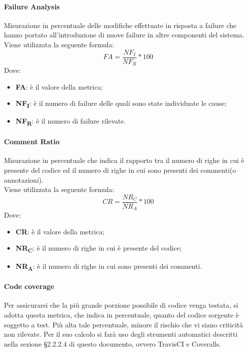 \paragraph{Failure Analysis}\Spazio
Misurazione in percentuale delle modifiche effettuate in risposta a failure che hanno portato all'introduzione di nuove failure in altre componenti del sistema. \\
Viene utilizzata la seguente formula:
$$FA=\frac{NF_I}{NF_R}*100$$
Dove:
\begin{itemize}
	\item{\textbf{FA}: è il valore della metrica;}
	\item{\textbf{NF\textsubscript{I}}: è il numero di failure delle quali sono state individuate le cause;}
	\item{\textbf{NF\textsubscript{R}}: è il numero di failure rilevate.}
\end{itemize}

\paragraph{Comment Ratio}\Spazio
Misurazione in percentuale che indica il rapporto tra il numero di righe in cui è presente del codice ed il numero di righe in cui sono presenti dei commenti(o annotazioni). \\
Viene utilizzata la seguente formula:
$$CR=\frac{NR_C}{NR_A}*100$$
Dove:
\begin{itemize}
	\item{\textbf{CR}: è il valore della metrica;}
	\item{\textbf{NR\textsubscript{C}}: è il numero di righe in cui è presente del codice;}
	\item{\textbf{NR\textsubscript{A}}: è il numero di righe in cui sono presenti dei commenti.}
\end{itemize}

\paragraph{Code coverage}\Spazio
Per assicurarsi che la più grande porzione possibile di codice venga testata, si adotta questa metrica, che indica in percentuale, quanto del codice sorgente
è soggetto a test. Più alta tale percentuale, minore il rischio che vi siano criticità non rilevate.
Per il suo calcolo si farà uso degli strumenti automatici descritti nella sezione §2.2.2.4 di questo documento, ovvero TravisCI e Coveralls.
